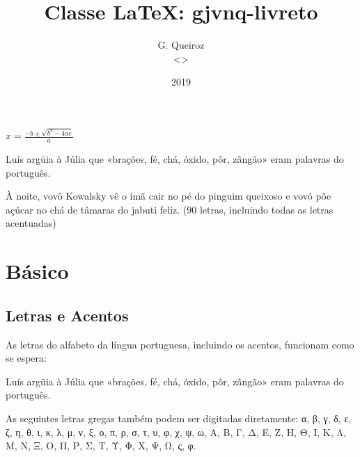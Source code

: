 \documentclass{gjvnq-livreto}
\title{Classe \LaTeX: gjvnq-livreto}
\author{G. Queiroz\\<\mailto{gabrieljvnq@gmail.com}>}
\date{2019}
\begin{document}
\maketitle
\vspace{10em}
\begin{center}
\ccbysa
\EndAccSupp{}

\footnotesize
{}
\end{center}
\clearpage
\tableofcontents
\clearpage


$x = \frac{-b \pm \sqrt{b^2 - 4ac}}{a}$

Luís argüia à Júlia que «brações, fé, chá, óxido, pôr, zângão» eram palavras do português.

À noite, vovô Kowalsky vê o ímã cair no pé do pinguim queixoso e vovó põe açúcar no chá de tâmaras do jabuti feliz. (90 letras, incluindo todas as letras acentuadas)


\chapter{Básico}

\section{Letras e Acentos}

As letras do alfabeto da língua portuguesa, incluindo os acentos, funcionam como se espera:

\begin{latexExample}
Luís argüia à Júlia que «brações, fé, chá, óxido, pôr, zângão» eram palavras do português.
\end{latexExample}

As seguintes letras gregas também podem ser digitadas diretamente: α, β, γ, δ, ε, ζ, η, θ, ι, κ, λ, μ, ν, ξ, ο, π, ρ, σ, τ, υ, φ, χ, ψ, ω, Α, Β, Γ, Δ, Ε, Ζ, Η, Θ, Ι, Κ, Λ, Μ, Ν, Ξ, Ο, Π, Ρ, Σ, Τ, Υ, Φ, Χ, Ψ, Ω, ς, φ.
\end{document}

